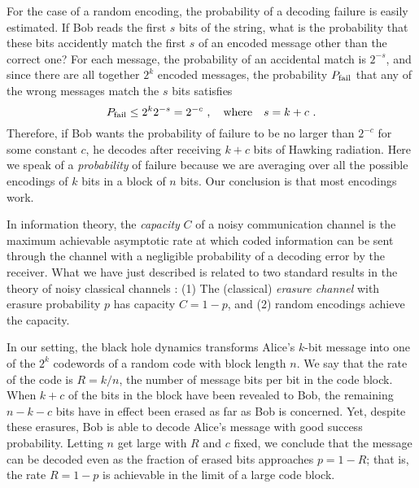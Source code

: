 \documentclass[11pt]{article}
\begin{document}
For the case of a random encoding, the probability of a decoding failure is easily estimated. If Bob reads the first $s$ bits of the string, what is the probability that these bits accidently match the first $s$ of an encoded message other than the correct one? For each message, the probability of an accidental match is $2^{-s}$, and since there are all together $2^k$ encoded messages, the probability $P_{\rm fail}$ that any of the wrong messages match the $s$ bits satisfies
\begin{equation}
\label{classical-out}
P_{\rm fail} \le 2^k 2^{-s}= 2^{-c}~,\quad {\rm where} \quad s=k+c~.
\end{equation}
Therefore, if Bob wants the probability of failure to be no larger than $2^{-c}$ for some constant $c$, he decodes after receiving $k+c$ bits of Hawking radiation. Here we speak of a {\em probability} of failure because we are averaging over all the possible encodings of $k$ bits in a block of $n$ bits. Our conclusion is that most encodings work. 

In information theory, the {\em capacity} $C$ of a noisy communication channel is the maximum achievable asymptotic rate at which coded information can be sent through the channel with a negligible probability of a decoding error by the receiver. What we have just described is related to two standard results in the theory of noisy classical channels \cite{cover}: (1) The (classical) {\em erasure channel} with erasure probability $p$ has capacity $C=1-p$, and (2) random encodings achieve the capacity.

In our setting, the black hole dynamics transforms Alice's $k$-bit message into one of the $2^k$ codewords of a random code with block length $n$. We say that the rate of the code is $R=k/n$, the number of message bits per bit in the code block. When $k+c$ of the bits in the block have been revealed to Bob, the remaining $n-k-c$ bits have in effect been erased as far as Bob is concerned. Yet, despite these erasures, Bob is able to decode Alice's message with good success probability. Letting $n$ get large with $R$ and $c$ fixed, we conclude that the message can be decoded even as the fraction of erased bits approaches $p=1-R$; that is, the rate $R=1-p$ is achievable in the limit of a large code block.
\end{document}

